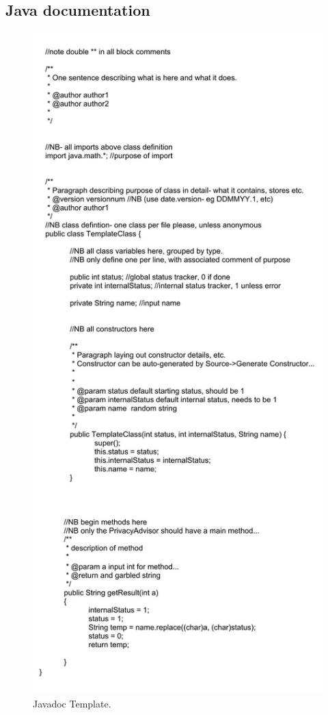 \subsection{Java documentation}
\begin{figure}[hthp]
\begin{center}
\includegraphics[height = \textheight/3*2]{Appendix/javadocTemp.jpg}
\caption{Javadoc Template.}
\label{JavadocTemplate}
\end{center}
\end{figure}
